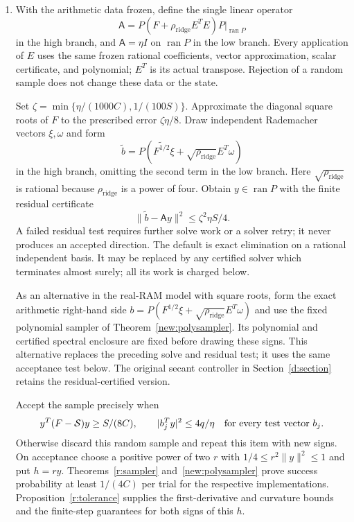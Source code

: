 \documentclass[11pt]{amsart}
\theoremstyle{definition}\newtheorem{definition}[theorem]{Definition}
\theoremstyle{remark}\newtheorem{remark}[theorem]{Remark}
\numberwithin{equation}{section}
\begin{document}
\begin{enumerate}
\item With the arithmetic data frozen, define the single linear operator
\[
 \mathsf A=P(F+\rho_{\mathrm{ridge}} E^TE)P\big|_{\operatorname{ran}P}
\]
in the high branch, and $\mathsf A=\eta I$ on $\operatorname{ran}P$ in
the low branch. Every application of $E$ uses the same frozen rational
coefficients, vector approximation, scalar certificate, and polynomial;
$E^T$ is its actual transpose. Rejection of a random sample does not change
these data or the state.

Set $\zeta=\min\{\eta/(1000C),1/(100S)\}$. Approximate the diagonal square
roots of $F$ to the prescribed error $\zeta\eta/8$. Draw independent
Rademacher vectors $\xi,\omega$ and form
\[
 \widetilde b=P(\widetilde{F^{1/2}}\xi+\sqrt{\rho_{\mathrm{ridge}}} E^T\omega)
\]
in the high branch, omitting the second term in the low branch.
Here $\sqrt{\rho_{\mathrm{ridge}}}$ is rational because $\rho_{\mathrm{ridge}}$ is a power of four.
Obtain $y\in\operatorname{ran}P$ with the finite residual certificate
\[
 \|\widetilde b-\mathsf Ay\|^2\le\zeta^2\eta S/4.
\]
A failed residual test requires further solve work or a solver retry; it
never produces an accepted direction. The default is exact elimination
on a rational independent basis. It may be replaced by any certified
solver which terminates almost surely; all its work is charged below.

As an alternative in the real-RAM model with square roots, form the exact
arithmetic right-hand side
$b=P(F^{1/2}\xi+\sqrt{\rho_{\mathrm{ridge}}}E^T\omega)$ and use the
fixed polynomial sampler of Theorem~\ref{new:polysampler}. Its polynomial
and certified spectral enclosure are fixed before drawing these signs.
This alternative replaces the preceding solve and residual test; it uses
the same acceptance test below. The original secant controller in
Section~\ref{d:section} retains the residual-certified version.

Accept the sample precisely when
\[
 y^T(F-\mathcal S)y\ge S/(8C),\qquad
 |b_j^Ty|^2\le4q/\eta\quad\hbox{for every test vector }b_j.
\]
Otherwise discard this random sample and repeat this item with new signs.
On acceptance choose a positive power of two $r$ with
$1/4\le r^2\|y\|^2\le1$ and put $h=ry$.
Theorems~\ref{r:sampler} and~\ref{new:polysampler} prove success
probability at least $1/(4C)$ per trial for the respective implementations. Proposition~\ref{r:tolerance} supplies the first-derivative and curvature
bounds and the finite-step guarantees for both signs of this $h$.
\end{enumerate}
\end{document}
